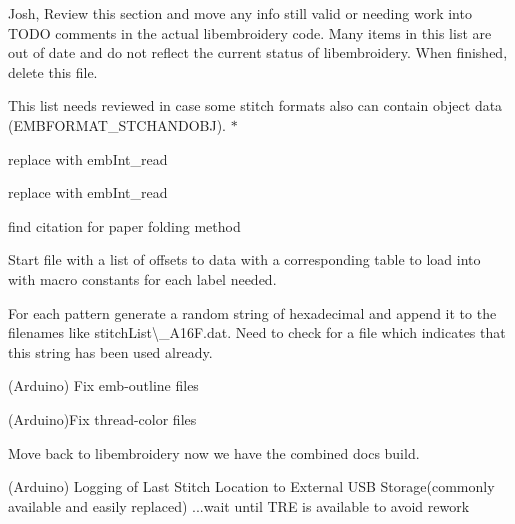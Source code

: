 \begin{DoxyRefList}
\label{todo__todo000213}%
%
Josh, Review this section and move any info still valid or needing work into TODO comments in the actual libembroidery code. Many items in this list are out of date and do not reflect the current status of libembroidery. When finished, delete this file. 
\item[Member \mbox{\hyperlink{formats_8c_a8cb11404ce46501561f956d33f8dcf95}{format\+Table}} \mbox{[}number\+Of\+Formats\mbox{]}]\label{todo__todo000242}%
%
This list needs reviewed in case some stitch formats also can contain object data (EMBFORMAT\+\_\+\+STCHANDOBJ). $\ast$  
\item[Member \mbox{\hyperlink{formats_8c_a05fb50e7292226bc2947dd2b4da7a9bd}{fread\+\_\+int32\+\_\+be}} (FILE $\ast$f)]\label{todo__todo000244}%
%
replace with emb\+Int\+\_\+read  
\item[Member \mbox{\hyperlink{formats_8c_a2bcdb1e6bf6930d5c054ecdca9831eba}{fread\+\_\+uint16}} (FILE $\ast$f)]\label{todo__todo000243}%
%
replace with emb\+Int\+\_\+read  
\item[Member \mbox{\hyperlink{fill_8c_ad02b5d945eacff708d2bf084c40044d8}{generate\+\_\+dragon\+\_\+curve}} (char $\ast$state, int iterations)]\label{todo__todo000237}%
%
find citation for paper folding method  
\item[Page \mbox{\hyperlink{geometry-and-algorithms}{Geometry and Algorithms}} ]\label{todo__todo000223}%
%
Start file with a list of offsets to data with a corresponding table to load into with macro constants for each label needed.

\label{todo__todo000224}%
%
For each pattern generate a random string of hexadecimal and append it to the filenames like {\ttfamily stitch\+List\textbackslash{}\+\_\+\+A16\+F.\+dat}. Need to check for a file which indicates that this string has been used already.

\label{todo__todo000215}%
%
(Arduino) Fix emb-\/outline files

\label{todo__todo000216}%
%
(Arduino)Fix thread-\/color files

\label{todo__todo000225}%
%
Move back to libembroidery now we have the combined docs build.

\label{todo__todo000217}%
%
(Arduino) Logging of Last Stitch Location to External USB Storage(commonly available and easily replaced) ...wait until TRE is available to avoid rework


\end{DoxyRefList}
